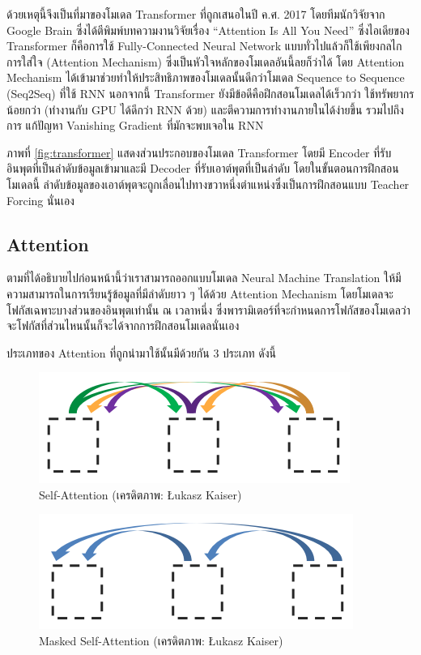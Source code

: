 ด้วยเหตุนี้จึงเป็นที่มาของโมเดล Transformer ที่ถูกเสนอในปี ค.ศ. 2017 โดยทีมนักวิจัยจาก Google Brain ซึ่งได้ตีพิมพ์บทความงานวิจัยเรื่อง 
\enquote{Attention Is All You Need}\autocite{vaswani2017a} ซึ่งไอเดียของ Transformer ก็คือการใช้ Fully-Connected 
Neural Network แบบทั่วไปแล้วก็ใช้เพียงกลไกการใส่ใจ (Attention Mechanism) ซึ่งเป็นหัวใจหลักของโมเดลอันนี้ลยก็ว่าได้ โดย Attention 
Mechanism ได้เข้ามาช่วยทำให้ประสิทธิภาพของโมเดลนั้นดีกว่าโมเดล Sequence to Sequence (Seq2Seq) ที่ใช้ RNN นอกจากนี้ Transformer 
ยังมีข้อดีคือฝึกสอนโมเดลได้เร็วกว่า ใช้ทรัพยากรน้อยกว่า (ทำงานกับ GPU ได้ดีกว่า RNN ด้วย) และตีความการทำงานภายในได้ง่ายขึ้น รวมไปถึงการ%
แก้ปัญหา Vanishing Gradient ที่มักจะพบเจอใน RNN 

ภาพที่ \ref{fig:transformer} แสดงส่วนประกอบของโมเดล Transformer โดยมี Encoder ที่รับอินพุตที่เป็นลำดับข้อมูลเข้ามาและมี Decoder 
ที่รับเอาต์พุตที่เป็นลำดับ โดยในขั้นตอนการฝึกสอนโมเดลนี้ ลำดับข้อมูลของเอาต์พุตจะถูกเลื่อนไปทางขวาหนึ่งตำแหน่งซึ่งเป็นการฝึกสอนแบบ Teacher 
Forcing นั่นเอง

\subsection{Attention}
\label{ssec:attention}

ตามที่ได้อธิบายไปก่อนหน้านี้ว่าเราสามารถออกแบบโมเดล Neural Machine Translation ให้มีความสามารถในการเรียนรู้ข้อมูลที่มีลำดับยาว ๆ 
ได้ด้วย Attention Mechanism โดยโมเดลจะโฟกัสเฉพาะบางส่วนของอินพุตเท่านั้น ณ เวลาหนึ่ง ซึ่งพารามิเตอร์ที่จะกำหนดการโฟกัสของโมเดลว่า%
จะโฟกัสที่ส่วนไหนนั้นก็จะได้จากการฝึกสอนโมเดลนั่นเอง

ประเภทของ Attention ที่ถูกนำมาใช้นั้นมีด้วยกัน 3 ประเภท ดังนี้

\begin{figure}[htbp]
    \centering
    \includegraphics[width=0.6\linewidth]{fig/attention_1_self.png}
    \caption{Self-Attention (เครดิตภาพ: Łukasz Kaiser)}
    \label{fig:self_attention}
\end{figure}

\begin{figure}[htbp]
    \centering
    \includegraphics[width=0.6\linewidth]{fig/attention_2_masked.png}
    \caption{Masked Self-Attention (เครดิตภาพ: Łukasz Kaiser)}
    \label{fig:masked_self_attention}
\end{figure}

